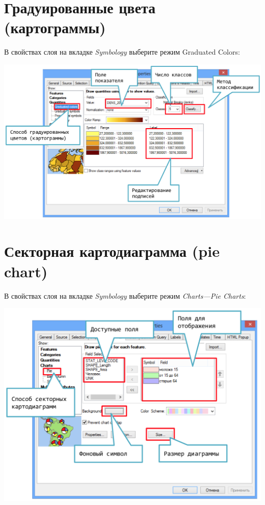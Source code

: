 \documentclass[12pt,]{book}
\begin{document}
\hypertarget{manual-vector-graduated}{%
\section{Градуированные цвета (картограммы)}\label{manual-vector-graduated}}

В свойствах слоя на вкладке \emph{Symbology} выберите режим Graduated Colors:

\includegraphics{images/Appendix/image21.png}

\hypertarget{manual-vector-pie}{%
\section{Секторная картодиаграмма (pie chart)}\label{manual-vector-pie}}

В свойствах слоя на вкладке \emph{Symbology} выберите режим \emph{Charts---Pie Charts}:

\includegraphics{images/Appendix/image22.png}
\end{document}
